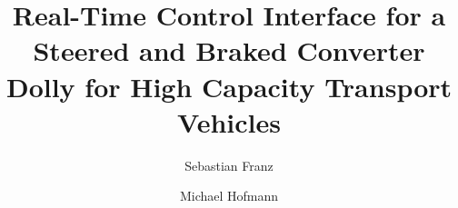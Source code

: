 \documentclass[masters,a4paper,12pt]{chalmers-thesis}
\title{Real-Time Control Interface for a Steered and Braked Converter Dolly for High Capacity Transport Vehicles}
\author{Sebastian Franz\and Michael Hofmann}
\begin{document}

\maketitle









%








\clearpage

\nocite{*} %
\printbibliography %
%
%
%
\end{document}
